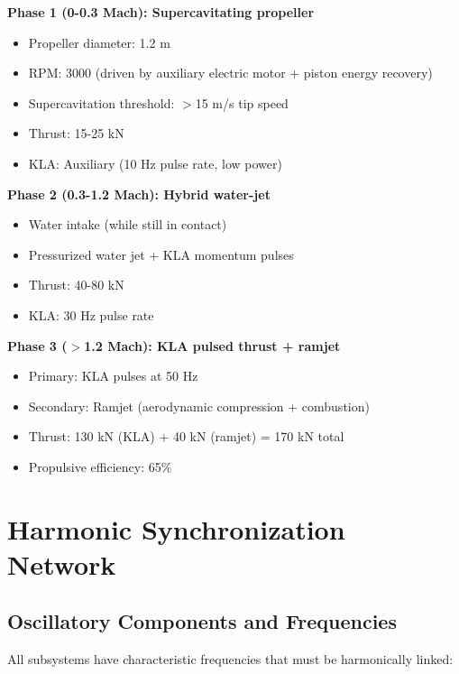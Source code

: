 \documentclass[12pt,a4paper]{article}
\begin{document}
\textbf{Phase 1 (0-0.3 Mach): Supercavitating propeller}
\begin{itemize}
\item Propeller diameter: 1.2 m
\item RPM: 3000 (driven by auxiliary electric motor + piston energy recovery)
\item Supercavitation threshold: $>$15 m/s tip speed
\item Thrust: 15-25 kN
\item KLA: Auxiliary (10 Hz pulse rate, low power)
\end{itemize}

\textbf{Phase 2 (0.3-1.2 Mach): Hybrid water-jet}
\begin{itemize}
\item Water intake (while still in contact)
\item Pressurized water jet + KLA momentum pulses
\item Thrust: 40-80 kN
\item KLA: 30 Hz pulse rate
\end{itemize}

\textbf{Phase 3 ($>$1.2 Mach): KLA pulsed thrust + ramjet}
\begin{itemize}
\item Primary: KLA pulses at 50 Hz
\item Secondary: Ramjet (aerodynamic compression + combustion)
\item Thrust: 130 kN (KLA) + 40 kN (ramjet) = 170 kN total
\item Propulsive efficiency: 65\%
\end{itemize}

\section{Harmonic Synchronization Network}

\subsection{Oscillatory Components and Frequencies}

All subsystems have characteristic frequencies that must be harmonically linked:
\end{document}

